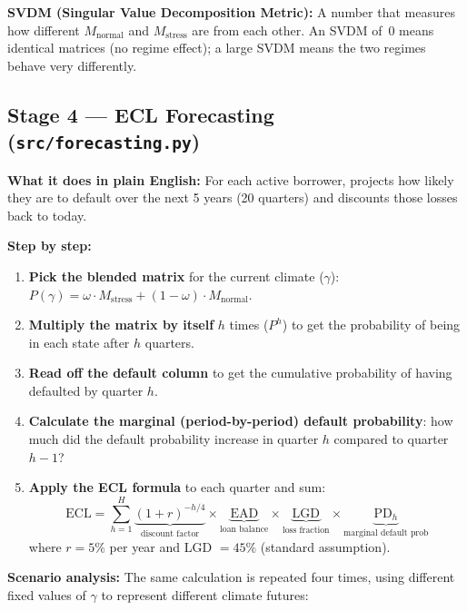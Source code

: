 \documentclass[12pt,a4paper]{article}
\begin{document}
\textbf{SVDM (Singular Value Decomposition Metric):}
A number that measures how different $M_{\text{normal}}$ and $M_{\text{stress}}$
are from each other.  An SVDM of~0 means identical matrices (no regime
effect); a large SVDM means the two regimes behave very differently.

\subsection{Stage 4 --- ECL Forecasting (\texttt{src/forecasting.py})}

\textbf{What it does in plain English:}
For each active borrower, projects how likely they are to default over the
next 5 years (20 quarters) and discounts those losses back to today.

\textbf{Step by step:}
\begin{enumerate}
  \item \textbf{Pick the blended matrix} for the current climate ($\gamma$):
        $P(\gamma) = \omega \cdot M_{\text{stress}} + (1-\omega) \cdot M_{\text{normal}}$.
  \item \textbf{Multiply the matrix by itself} $h$ times ($P^h$) to get the
        probability of being in each state after $h$ quarters.
  \item \textbf{Read off the default column} to get the cumulative probability
        of having defaulted by quarter $h$.
  \item \textbf{Calculate the marginal (period-by-period) default probability}:
        how much did the default probability increase in quarter $h$ compared
        to quarter $h-1$?
  \item \textbf{Apply the ECL formula} to each quarter and sum:
        \[
          \text{ECL} = \sum_{h=1}^{H}
          \underbrace{(1+r)^{-h/4}}_{\text{discount factor}}
          \times \underbrace{\text{EAD}}_{\text{loan balance}}
          \times \underbrace{\text{LGD}}_{\text{loss fraction}}
          \times \underbrace{\text{PD}_h}_{\text{marginal default prob}}
        \]
        where $r = 5\%$ per year and LGD $= 45\%$ (standard assumption).
\end{enumerate}

\textbf{Scenario analysis:}
The same calculation is repeated four times, using different fixed values of
$\gamma$ to represent different climate futures:
\end{document}

